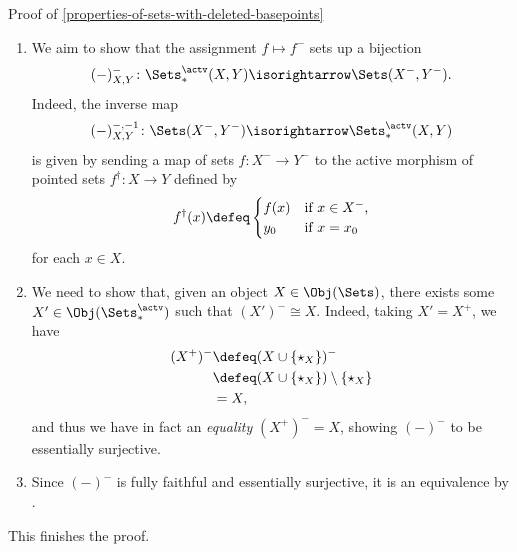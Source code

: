 \begin{Proof}{Proof of \cref{properties-of-sets-with-deleted-basepoints}}
\begin{enumerate}
        \item\label{proof-of-properties-of-sets-with-deleted-basepoints-adjoint-equivalence-8}We aim to show that the assignment $f\mapsto f^{-}$ sets up a bijection
            \[
                (-)^{-}_{X,Y}%
                \colon%
                \Sets^{\actv}_{*}(X,Y)%
                \isorightarrow%
                \Sets(X^{-},Y^{-}).%
            \]%
            Indeed, the inverse map
            \[
                (-)^{-,-1}_{X,Y}%
                \colon%
                \Sets(X^{-},Y^{-})%
                \isorightarrow%
                \Sets^{\actv}_{*}(X,Y)%
            \]%
            is given by sending a map of sets $f\colon X^{-}\to Y^{-}$ to the active morphism of pointed sets $f^{\dagger}\colon X\to Y$ defined by
            \[
                f^{\dagger}(x)%
                \defeq%
                \begin{cases}
                    f(x)  &\text{if $x\in X^{-}$,}\\
                    y_{0} &\text{if $x=x_{0}$}
                \end{cases}
            \]%
            for each $x\in X$.
        \item\label{proof-of-properties-of-sets-with-deleted-basepoints-adjoint-equivalence-9}We need to show that, given an object $X\in\Obj(\Sets)$, there exists some $X'\in\Obj(\Sets^{\actv}_{*})$ such that $(X')^{-}\cong X$. Indeed, taking $X'=X^{+}$, we have
            \begin{align*}
                (X^{+})^{-} &\defeq (X\cup\{\star_{X}\})^{-}\\
                            &\defeq (X\cup\{\star_{X}\})\setminus\{\star_{X}\}\\
                            &=      X,
            \end{align*}
            and thus we have in fact an \emph{equality} $(X^{+})^{-}=X$, showing $(-)^{-}$ to be essentially surjective.
        \item\label{proof-of-properties-of-sets-with-deleted-basepoints-adjoint-equivalence-10}Since $(-)^{-}$ is fully faithful and essentially surjective, it is an equivalence by .
    \end{enumerate}
    This finishes the proof.


\end{Proof}
